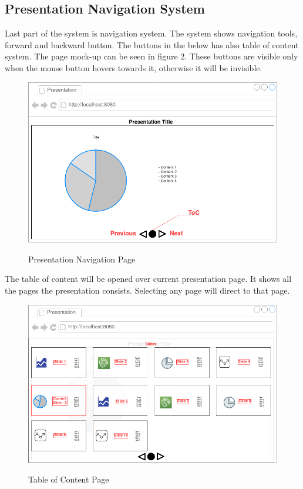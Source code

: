\subsection{Presentation Navigation System}

Last part of the system is navigation system. The system shows navigation tools, forward and backward button. The buttons in the below has also table of content system. The page mock-up can be seen in figure 2. These buttons are visible only when the mouse button hovers towards it, otherwise it will be invisible.

\begin{figure}[h]
    \href{https://raw.githubusercontent.com/krmacit/SWE599-Project-Report-2021S-Macit-KerimCan/master/Mockups/NavigationSystem_1.png}{\includegraphics[scale=0.32]{Mockups/NavigationSystem_1.png}}
    \caption{Presentation Navigation Page}
\end{figure}

The table of content will be opened over current presentation page. It shows all the pages the presentation consists. Selecting any page will direct to that page. 

\begin{figure}[h]
\href{https://raw.githubusercontent.com/krmacit/SWE599-Project-Report-2021S-Macit-KerimCan/master/Mockups/NavigationSystem_2.png}{\includegraphics[scale=0.315]{Mockups/NavigationSystem_2.png}}
    \caption{Table of Content Page}
\end{figure}